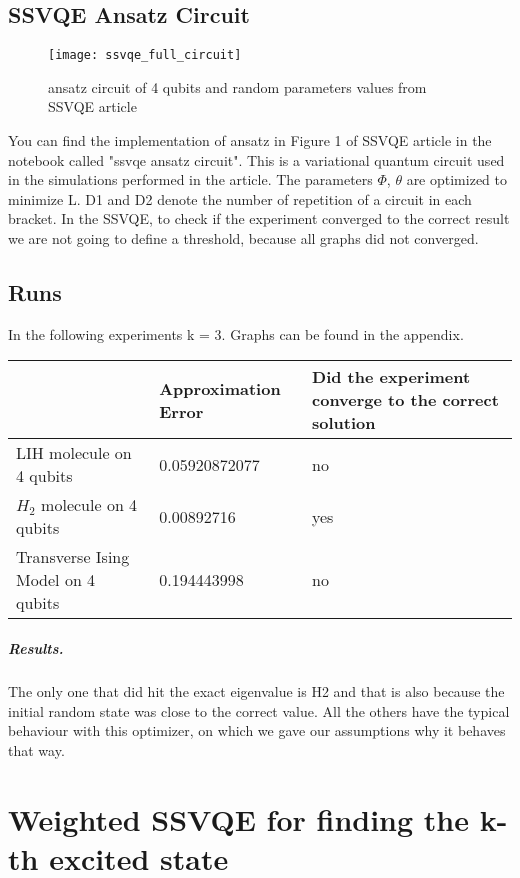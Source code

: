 \documentclass[12pt, a4paper]{article}
\begin{document}
    \subsection{SSVQE Ansatz Circuit}
    \begin{figure}
        \texttt{[image: ssvqe\_full\_circuit]}
        \centering
        \caption{ansatz circuit of 4 qubits and random parameters values from SSVQE article}
    \end{figure}
    You can find the implementation of ansatz in Figure 1 of SSVQE article in the notebook called "ssvqe ansatz circuit".
    This is a variational quantum circuit used in the simulations performed in the article.
    The parameters $\Phi$, $\theta$ are optimized to minimize L. D1 and D2 denote the number of repetition of a circuit in each bracket. In the SSVQE, to check if the experiment converged to the correct result we are not going to define a threshold, because all graphs did not converged.


    \subsection{Runs}
    In the following experiments k = 3.
    Graphs can be found in the appendix.

    \begin{tabular}{|p{3cm}|p{3cm}|p{3cm}|}
        \hline
        & Approximation Error & Did the experiment converge to the correct solution   \\   \hline\hline
        LIH molecule on 4 qubits & 0.05920872077 & no\\  \hline
        $H_2$ molecule on 4 qubits & 0.00892716 & yes\\  \hline
        Transverse Ising Model on 4 qubits & 0.194443998  & no\\
        \hline
    \end{tabular}
    \subparagraph{Results.}
    \label{sec:ssvqe_convergence}
    The only one that did hit the exact eigenvalue is H2 and that is also because the initial random state was close to the correct value. All the others have the typical behaviour with this optimizer, on which we gave our assumptions why it behaves that way.

    \section{Weighted SSVQE for finding the k-th excited state}
\end{document}
